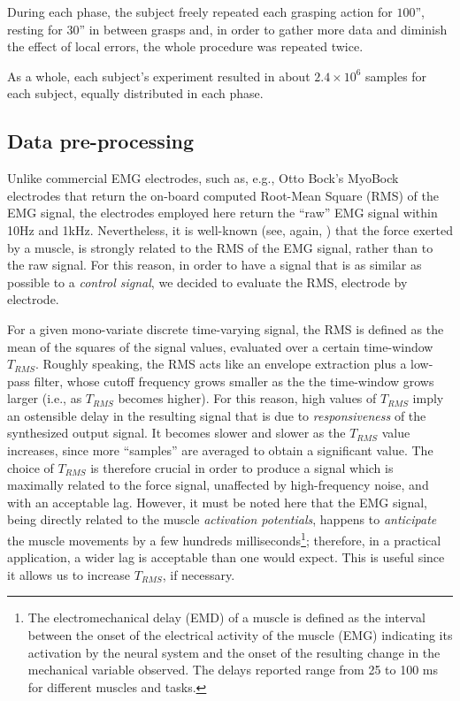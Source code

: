 During each phase, the subject freely repeated each grasping action for $100$'', resting for $30$'' in between grasps and, in order to gather more data and diminish the effect of local errors, the whole procedure was repeated twice.

As a whole, each subject's experiment resulted in about $2.4\times 10^6$ samples for each subject, equally distributed in each phase.

\subsection{Data pre-processing}

Unlike commercial EMG electrodes, such as, e.g., Otto Bock's MyoBock electrodes \cite{ottobock} that return the on-board computed Root-Mean Square (RMS) of the EMG signal, the electrodes employed here return the ``raw'' EMG signal within 10Hz and 1kHz. %
Nevertheless, it is well-known (see, again, \cite{deluca,zecca}) that the force exerted by a muscle, is strongly related to the RMS of the EMG signal, rather than to the raw signal. For this reason, in order to have a signal that is as similar as possible to a \emph{control signal}, we decided to evaluate the RMS, electrode by electrode.

For a given mono-variate discrete time-varying signal, the RMS is defined as the mean of the squares of the signal values, evaluated over a certain time-window $T_{RMS}$. Roughly speaking, the RMS acts like an envelope extraction plus a low-pass filter, whose cutoff frequency grows smaller as the the time-window grows larger (i.e., as $T_{RMS}$ becomes higher). For this reason, high values of $T_{RMS}$ imply an ostensible delay in the resulting signal that is due to \emph{responsiveness} of the synthesized output signal. It becomes slower and slower as the $T_{RMS}$ value increases, since more ``samples'' are averaged to obtain a significant value. The choice of $T_{RMS}$ is therefore crucial in order to produce a signal which is maximally related to the force signal, unaffected by high-frequency noise, and with an acceptable lag. However, it must be noted here that the EMG signal, being directly related to the muscle \emph{activation potentials}, happens to \emph{anticipate} the muscle movements by a few hundreds milliseconds\footnote{The electromechanical delay (EMD) of a muscle is defined as the interval between the onset of the electrical activity of the muscle (EMG) indicating its activation by the neural system and the onset of the resulting change in the mechanical variable observed. The delays reported range from 25 to 100 ms for different muscles and tasks\cite{Wolf1994}.}; therefore, in a practical application, a wider lag is acceptable than one would expect. This is useful since it allows us to increase $T_{RMS}$, if necessary.

